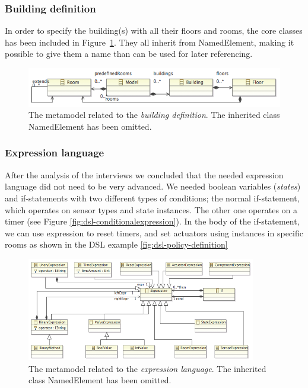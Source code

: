 \subsubsection{Building definition}
In order to specify the building(s) with all their floors and rooms, the core classes has been included in Figure \ref{fig:ecore-building-definition}. They all inherit from NamedElement, making it possible to give them a name than can be used for later referencing.
\begin{figure}[h]
  \centering \includegraphics[scale=0.4]{ecore-building-definition.png}  
	\caption{The metamodel related to the \textit{building definition}. The inherited class NamedElement has been omitted.}
	\label{fig:ecore-building-definition}
\end{figure}

\subsubsection{Expression language}
After the analysis of the interviews we concluded that the needed expression language did not need to be very advanced. We needed boolean variables (\textit{states}) and if-statements with two different types of conditions; the normal if-statement, which operates on sensor types and state instances. The other one operates on a timer (see Figure \ref{fig:dsl-conditionalexpression}). In the body of the if-statement, we can use expression to reset timers, and set actuators using instances in specific rooms as shown in the DSL example \ref{fig:dsl-policy-definition}

\begin{figure}[h]
  \centering
    \includegraphics[width=10cm]{ecore-expression-language.png} 
	\caption{The metamodel related to the \textit{expression language}. The inherited class NamedElement has been omitted.}
	\label{fig:ecore-expression-language}
\end{figure}

